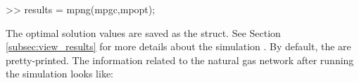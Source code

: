 \begin{Code}
>> results = mpng(mpgc,mpopt);         %
\end{Code}

The optimal solution values are saved as the  struct.  See Section \ref{subsec:view_results} for more details about the simulation . By default, the  are pretty-printed. The information related to the natural gas network after running the simulation looks like:\\

%			
%			
